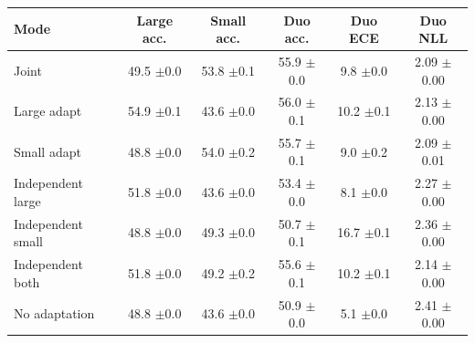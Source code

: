 \begin{table}[t]
    \label{tab:adaptation_modes_summary:tent__vitb16_convnextt_bn_heldout}
    \begin{tabular}{lccccc}
        \toprule
        Mode & Large acc. & Small acc. & Duo acc. & Duo ECE & Duo NLL \\
        \midrule
        Joint & 49.5 {\scriptsize$\pm$0.0} & 53.8 {\scriptsize$\pm$0.1} & 55.9 {\scriptsize$\pm$0.0} & 9.8 {\scriptsize$\pm$0.0} & 2.09 {\scriptsize$\pm$0.00} \\
        Large adapt & 54.9 {\scriptsize$\pm$0.1} & 43.6 {\scriptsize$\pm$0.0} & 56.0 {\scriptsize$\pm$0.1} & 10.2 {\scriptsize$\pm$0.1} & 2.13 {\scriptsize$\pm$0.00} \\
        Small adapt & 48.8 {\scriptsize$\pm$0.0} & 54.0 {\scriptsize$\pm$0.2} & 55.7 {\scriptsize$\pm$0.1} & 9.0 {\scriptsize$\pm$0.2} & 2.09 {\scriptsize$\pm$0.01} \\
        \midrule
        Independent large & 51.8 {\scriptsize$\pm$0.0} & 43.6 {\scriptsize$\pm$0.0} & 53.4 {\scriptsize$\pm$0.0} & 8.1 {\scriptsize$\pm$0.0} & 2.27 {\scriptsize$\pm$0.00} \\
        Independent small & 48.8 {\scriptsize$\pm$0.0} & 49.3 {\scriptsize$\pm$0.0} & 50.7 {\scriptsize$\pm$0.1} & 16.7 {\scriptsize$\pm$0.1} & 2.36 {\scriptsize$\pm$0.00} \\
        Independent both & 51.8 {\scriptsize$\pm$0.0} & 49.2 {\scriptsize$\pm$0.2} & 55.6 {\scriptsize$\pm$0.1} & 10.2 {\scriptsize$\pm$0.1} & 2.14 {\scriptsize$\pm$0.00} \\
        \midrule
        No adaptation & 48.8 {\scriptsize$\pm$0.0} & 43.6 {\scriptsize$\pm$0.0} & 50.9 {\scriptsize$\pm$0.0} & 5.1 {\scriptsize$\pm$0.0} & 2.41 {\scriptsize$\pm$0.00} \\
        \bottomrule
    \end{tabular}
\end{table}
